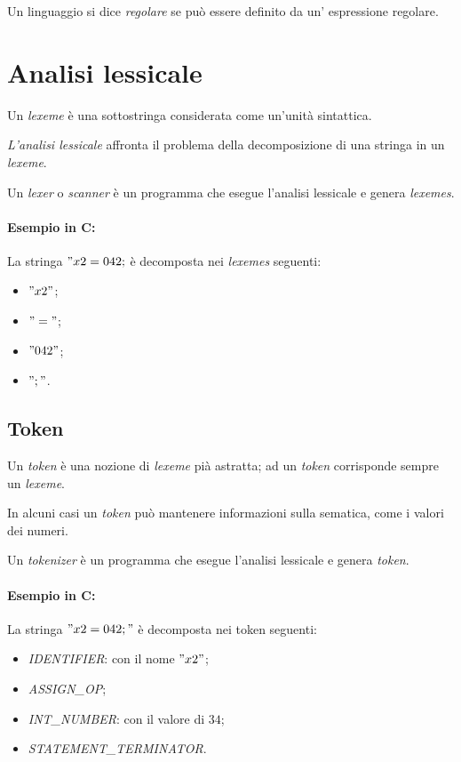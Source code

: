 \begin{theorem}
  Un linguaggio si dice \emph{regolare} se può essere definito da un'
  espressione regolare.
\end{theorem}

\section{Analisi lessicale}
\begin{theorem}
  Un \emph{lexeme} è una sottostringa considerata come un'unità sintattica.
\end{theorem}

\begin{theorem}
  \emph{L'analisi lessicale} affronta il problema della decomposizione di
  una stringa in un \emph{lexeme}.
\end{theorem}

\begin{theorem}
  Un \emph{lexer} o \emph{scanner} è un programma che esegue l'analisi
  lessicale e genera \emph{lexemes}.
\end{theorem}

\paragraph{Esempio in C:}
La stringa $"x2=042;$ è decomposta nei \emph{lexemes} seguenti:
\begin{itemize}
  \item $"x2"$;
  \item $"="$;
  \item $"042"$;
  \item $";"$.
\end{itemize}

\subsection{Token}
Un \emph{token} è una nozione di \emph{lexeme} pià astratta; ad un \emph{token}
corrisponde sempre un \emph{lexeme}.

In alcuni casi un \emph{token} può mantenere informazioni sulla sematica,
come i valori dei numeri.

Un \emph{tokenizer} è un programma che esegue l'analisi lessicale e genera
\emph{token}.

\paragraph{Esempio in C:}
La stringa $"x2=042;"$ è decomposta nei token seguenti:
\begin{itemize}
  \item \emph{IDENTIFIER}: con il nome $"x2"$;
  \item \emph{ASSIGN\_OP};
  \item \emph{INT\_NUMBER}: con il valore di $34$;
  \item \emph{STATEMENT\_TERMINATOR}.
\end{itemize}

